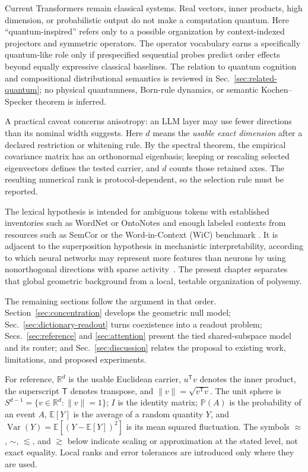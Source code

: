\documentclass[
  aps,
  reprint,
  superscriptaddress,
  floatfix,
  nofootinbib,
  longbibliography
]{revtex4-2}
\newcommand{\R}{\mathbb{R}}
\newcommand{\E}{\mathbb{E}}
\newcommand{\Prob}{\mathbb{P}}
\newcommand{\Sph}[1]{S^{#1}}
\newcommand{\T}{^{\mathsf{T}}}
\newcommand{\norm}[1]{\lVert #1 \rVert}
\DeclareMathOperator{\Var}{Var}
\begin{document}
Current Transformers remain classical systems.  Real vectors, inner products,
high dimension, or probabilistic output do not make a computation quantum.
Here ``quantum-inspired'' refers only to a possible organization by
context-indexed projectors and symmetric operators.  The operator vocabulary
earns a specifically quantum-like role only if prespecified sequential probes
predict order effects beyond equally expressive classical baselines.  The
relation to quantum cognition and compositional distributional semantics is
reviewed in Sec.~\ref{sec:related-quantum}; no physical quantumness, Born-rule
dynamics, or semantic Kochen--Specker theorem is inferred.

A practical caveat concerns anisotropy: an LLM layer may use fewer directions
than its nominal width suggests.  Here $d$ means the \emph{usable exact
dimension} after a declared restriction or whitening rule.  By the spectral
theorem, the empirical covariance matrix has an orthonormal eigenbasis; keeping
or rescaling selected eigenvectors defines the tested carrier, and $d$ counts
those retained axes.  The resulting numerical rank is protocol-dependent, so
the selection rule must be reported.

The lexical hypothesis is intended for ambiguous tokens with established
inventories such as WordNet or OntoNotes and enough labeled contexts from
resources such as SemCor or the Word-in-Context (WiC) benchmark
\cite{pilehvar2019wic}.  It is adjacent to the superposition hypothesis in
mechanistic interpretability, according to which neural networks may represent
more features than neurons by using nonorthogonal directions with sparse
activity~\cite{elhage2022superposition}.  The present chapter separates that
global geometric background from a local, testable organization of polysemy.

The remaining sections follow the argument in that order.
Section~\ref{sec:concentration} develops the geometric null model;
Sec.~\ref{sec:dictionary-readout} turns coexistence into a readout problem;
Secs.~\ref{sec:reference} and \ref{sec:attention} present the tied
shared-subspace model and its router; and Sec.~\ref{sec:discussion} relates the
proposal to existing work, limitations, and proposed experiments.

For reference, $\R^d$ is the usable Euclidean carrier, $u\T v$ denotes the
inner product, the superscript $\mathsf T$ denotes transpose, and
$\norm{v}=\sqrt{v\T v}$.  The unit sphere is
$\Sph{d-1}=\{v\in\R^d:\norm v=1\}$; $I$ is the identity matrix;
$\Prob(A)$ is the probability of an event $A$, $\E[Y]$ is the average of a
random quantity $Y$, and
$\Var(Y)=\E[(Y-\E[Y])^2]$ is its mean squared fluctuation.  The
symbols $\approx$, $\sim$, $\lesssim$, and $\gtrsim$ below indicate scaling or
approximation at the stated level, not exact equality.  Local ranks and error
tolerances are introduced only where they are used.
\end{document}
